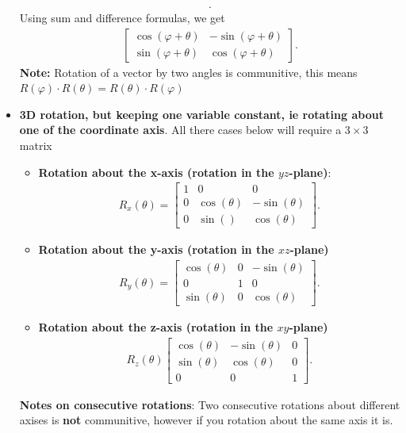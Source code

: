\documentclass{report}
\begin{document}
\begin{itemize}
\begin{align*}
            .\end{align*}
            Using sum and difference formulas, we get
            \begin{align*}
                \begin{bmatrix} \cos{\left(\varphi + \theta \right)}& -\sin{\left(\varphi + \theta \right)}\\ \sin{\left(\varphi + \theta \right)}  & \cos{\left(\varphi + \theta \right)}\end{bmatrix}
            .\end{align*}
            \bigbreak \noindent 
            \textbf{Note:} Rotation of a vector by two angles is communitive, this means $R(\varphi) \cdot R(\theta ) = R(\theta) \cdot R(\varphi) $ 
        \item \textbf{3D rotation, but keeping one variable constant, ie rotating about one of the coordinate axis}. 
            \bigbreak \noindent 
            All there cases below will require a $3\times 3$ matrix
            \begin{itemize}
                \item \textbf{Rotation about the x-axis (rotation in the $yz$-plane)}: 
                    \begin{align*}
                        R_{x}(\theta ) =  \begin{bmatrix} 1 & 0 & 0 \\ 0 & \cos{\left(\theta \right)} & -\sin{\left(\theta \right)} \\ 0 & \sin{\left(\right)} & \cos{\left(\theta \right)}\end{bmatrix}
                    .\end{align*}
                \item \textbf{Rotation about the y-axis (rotation in the $xz$-plane)}
                    \begin{align*}
                        R_{y}(\theta ) = \begin{bmatrix} \cos{\left(\theta   \right)} & 0 & -\sin{\left(\theta \right)} \\ 0 & 1 & 0 \\ \sin{\left(\theta \right)} & 0 & \cos{\left(\theta \right)}\end{bmatrix}
                    .\end{align*}
                \item \textbf{Rotation about the z-axis (rotation in the $xy$-plane)}
                    \begin{align*}
                        R_{z}(\theta ) \begin{bmatrix} \cos{\left(\theta \right)} & -\sin{\left(\theta \right)} & 0 \\ \sin{\left(\theta \right)} & \cos{\left(\theta \right)} & 0 \\ 0 & 0 & 1\end{bmatrix}
                    .\end{align*}
            \end{itemize}
            \bigbreak \noindent 
            \textbf{Notes on consecutive rotations}: Two consecutive rotations about different axises is \textbf{not} communitive, however if you rotation about the same axis it is.


\end{itemize}
\end{document}
